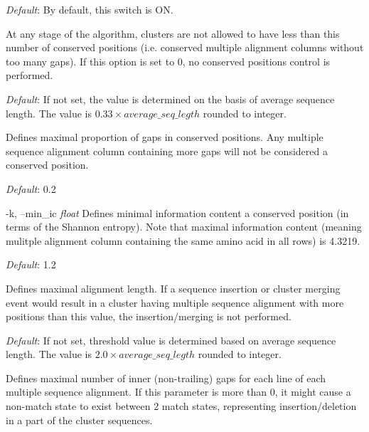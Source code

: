 \documentclass[11pt, a4paper, twoside, titlepage]{article}
\begin{document}
\begin{description}
	    \textit{Default}: By default, this switch is ON. 
	    
	  
	  	  \item[-h, --min\_conserved\_positions \rm \textlangle \textit{int}\textrangle] At any stage of the algorithm, clusters are not allowed to have less than this number of conserved positions (i.e. conserved multiple alignment columns without too many gaps). If this option is set to 0, no conserved positions control is performed. 
	  	  
	  	  \textit{Default}: If not set, the value is determined on the basis of average sequence length. The value is $0.33 \times average\_seq\_legth$ rounded to integer.
	  	  
	  	  	  	  \item[-y, --max\_gap\_proportion \rm \textlangle \textit{float}\textrangle] 
	  	  	  	  Defines maximal proportion of gaps in conserved positions. Any multiple sequence alignment column containing more gaps will not be considered a conserved position.
	  	  
	  	  \textit{Default}: 0.2
	  	  
\begin{sloppypar}	
	  	  
	  	  	  	  	  	  \item[-k, --min\_ic \rm \textlangle \textit{float}\textrangle] Defines minimal information content a conserved position (in terms of the Shannon entropy). Note that maximal information content (meaning mulitple alignment column containing the same amino acid in all rows) is 4.3219. 
	  	  	  	  	  	  
\end{sloppypar}	
	  	  
	  	  \textit{Default}: 1.2
	  	  	  	  
	  	  
	  	  	  	\item[-j, --max\_aln\_length \rm \textlangle \textit{int}\textrangle] Defines maximal alignment length. If a sequence insertion or cluster merging event would result in a cluster having multiple sequence alignment with more positions than this value, the insertion/merging is not performed.
	  	  	  	
	  	  	  	\textit{Default}: If not set, threshold value is determined based on average sequence length. The value is $2.0 \times average\_seq\_legth$ rounded to integer.
	  	  	  	
	  	  	  		  	  	  	\item[-u, --max\_inner\_gaps \rm \textlangle \textit{int}\textrangle]  Defines maximal number of inner (non-trailing) gaps for each line of each multiple sequence alignment. If this parameter is more than 0, it might cause a non-match state to exist between 2 match states, representing insertion/deletion in a part of the cluster sequences.
	  	  	  	

\end{description}
\end{document}

